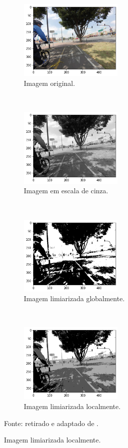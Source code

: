 \begin{figure}[H]
   \caption{Limiarizações.}
   \centering
   \label{segment:fig:3}
    \begin{subfigure}[t]{0.45\textwidth}
        \centering
        \includegraphics[height=1.5in]{recursos/imagens/image_seg/mapi.png}
        \caption{Imagem original.}
        \label{segment:fig:3.1}
    \end{subfigure}%
    ~ 
    \begin{subfigure}[t]{0.45\textwidth}
        \centering
        \includegraphics[height=1.5in]{recursos/imagens/image_seg/gray_mapi.png}
        \caption{Imagem em escala de cinza.}
        \label{segment:fig:3.2}
    \end{subfigure}%
    ~ 
    
    \begin{subfigure}[t]{0.45\textwidth}
        \centering
        \includegraphics[height=1.5in]{recursos/imagens/image_seg/bw_mapi.png}
        \caption{Imagem limiarizada globalmente.}
        \label{segment:fig:3.3}
    \end{subfigure}
    ~
    \begin{subfigure}[t]{0.45\textwidth}
        \centering
        \includegraphics[height=1.5in]{recursos/imagens/image_seg/local_mapi.png}
        \caption{Imagem limiarizada localmente.}
        \label{segment:fig:3.4}
    \end{subfigure}

    Fonte: retirado e adaptado de \cite{Neuhold2017_ICCV}.
\end{figure}

